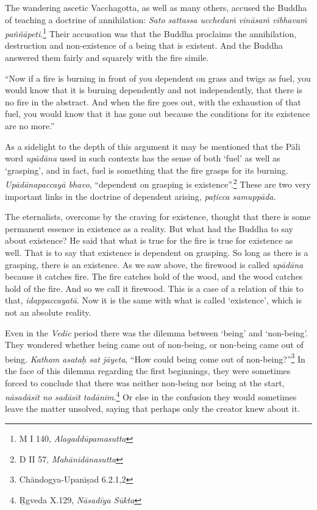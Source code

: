 The wandering ascetic Vacchagotta, as well as many others, accused the Buddha of teaching a doctrine of annihilation: \emph{Sato sattassa ucchedaṁ vināsaṁ vibhavaṁ paññāpeti}.\footnote{M I 140, \emph{Alagaddūpamasutta}} Their accusation was that the Buddha proclaims the annihilation, destruction and non-existence of a being that is existent. And the Buddha answered them fairly and squarely with the fire simile.

``Now if a fire is burning in front of you dependent on grass and twigs as fuel, you would know that it is burning dependently and not independently, that there is no fire in the abstract. And when the fire goes out, with the exhaustion of that fuel, you would know that it has gone out because the conditions for its existence are no more.''

As a sidelight to the depth of this argument it may be mentioned that the Pāli word \emph{upādāna} used in such contexts has the sense of both `fuel' as well as `grasping', and in fact, fuel is something that the fire grasps for its burning. \emph{Upādānapaccayā bhavo}, ``dependent on grasping is existence''.\footnote{D II 57, \emph{Mahānidānasutta}} These are two very important links in the doctrine of dependent arising, \emph{paṭicca samuppāda}.

The eternalists, overcome by the craving for existence, thought that there is some permanent essence in existence as a reality. But what had the Buddha to say about existence? He said that what is true for the fire is true for existence as well. That is to say that existence is dependent on grasping. So long as there is a grasping, there is an existence. As we saw above, the firewood is called \emph{upādāna} because it catches fire. The fire catches hold of the wood, and the wood catches hold of the fire. And so we call it firewood. This is a case of a relation of this to that, \emph{idappaccayatā}. Now it is the same with what is called `existence', which is not an absolute reality.

Even in the \emph{Vedic} period there was the dilemma between `being' and `non-being'. They wondered whether being came out of non-being, or non-being came out of being. \emph{Katham asataḥ sat jāyeta}, ``How could being come out of non-being?''\footnote{Chāndogya-Upaniṣad 6.2.1,2} In the face of this dilemma regarding the first beginnings, they were sometimes forced to conclude that there was neither non-being nor being at the start, \emph{nāsadāsīt no sadāsīt tadānīm}.\footnote{Ṛgveda X.129, \emph{Nāsadīya Sūkta}} Or else in the confusion they would sometimes leave the matter unsolved, saying that perhaps only the creator knew about it.

